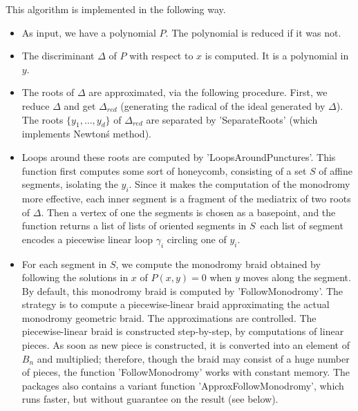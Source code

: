 This algorithm is implemented in the following way.

\begin{itemize}
\item As input,  we have a polynomial $P$. The  polynomial is reduced if
it was not.

\item The discriminant $\Delta$ of $P$  with respect to $x$ is computed.
It is a polynomial in $y$.

\item  The  roots  of  $\Delta$  are  approximated,  via  the  following
procedure. First, we reduce  $\Delta$ and get $\Delta_{red}$ (generating
the   radical  of   the  ideal   generated  by   $\Delta$).  The   roots
$\{y_1,\dots,y_d\}$ of  $\Delta_{red}$ are separated  by 'SeparateRoots'
(which implements Newton\'s method).

\item Loops  around these roots are  computed by 'LoopsAroundPunctures'.
This function first computes some sort of honeycomb, consisting of a set
$S$  of  affine  segments,  isolating  the $y_i$.  Since  it  makes  the
computation of  the monodromy  more effective, each  inner segment  is a
fragment of the mediatrix of two roots of $\Delta$. Then a vertex of one
the segments is  chosen as a basepoint, and the  function returns a list
of lists of  oriented segments in $S$\:\ each list  of segment encodes a
piecewise linear loop $\gamma_i$ circling one of $y_i$.

\item For each  segment in $S$, we compute the  monodromy braid obtained
by  following  the  solutions  in  $x$  of  $P(x,y)=0$  when  $y$  moves
along  the segment.  By default,  this  monodromy braid  is computed  by
'FollowMonodromy'. The  strategy is to compute  a piecewise-linear braid
approximating the  actual monodromy geometric braid.  The approximations
are controlled. The piecewise-linear  braid is constructed step-by-step,
by computations of linear pieces. As soon as new piece is constructed, it
is converted into an element  of $B_n$ and multiplied; therefore, though
the  braid  may  consist  of  a huge  number  of  pieces,  the  function
'FollowMonodromy' works with constant memory. The packages also contains
a  variant  function  'ApproxFollowMonodromy', which  runs  faster,  but
without guarantee on the result (see below).


\end{itemize}
